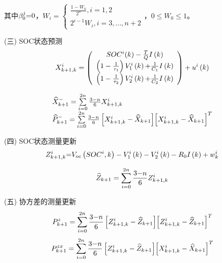 其中$\beta _0^j{\rm{ = }}0$，${W_i} = \left\{ \begin{array}{l}
\frac{{1 - {W_0}}}{{{2^n}}},i = 1,2\\
{2^{i - 1}}{W_i},i = 3,...,n + 2
\end{array} \right.$，$0 \le {W_0} \le 1$。

(三)	SOC状态预测
\begin{equation}
X_{k + 1,k}^i = \left( {\begin{array}{*{20}{c}}
{SO{C^i}(k) - \frac{T}{Q}I\left( k \right)}\\
{\left( {1 - \frac{1}{{{\tau _1}}}} \right)V_1^i\left( k \right){\rm{ + }}\frac{1}{{{C_1}}}I\left( k \right)}\\
{\left( {1 - \frac{1}{{{\tau _2}}}} \right)V_2^i\left( k \right){\rm{ + }}\frac{1}{{{C_2}}}I\left( k \right)}
\end{array}} \right) + {u^i}\left( k \right)
\end{equation}

\begin{equation}
\begin{array}{l}
\widehat X_{k + 1}^ -  = \sum\limits_{i = 0}^{2n} {\frac{{3{\rm{ - }}n}}{6}X_{k + 1,k}^i} \\
\widehat P_{k + 1}^ -  = \sum\limits_{i = 0}^{2n} {\frac{{3{\rm{ - }}n}}{6}\left[ {X_{k + 1,k}^i - {{\widehat X}_{k + 1}}} \right]} {\left[ {X_{k + 1,k}^i - {{\widehat X}_{k + 1}}} \right]^T}
\end{array}
\end{equation}

(四)	SOC状态测量更新
\begin{equation}
Z_{k + 1,k}^i{\rm{ = }}{V_{oc}}\left( {SO{C^i},k} \right) - V_1^i\left( k \right) - V_2^i\left( k \right) - {R_0}I\left( k \right) + w_k^i
\end{equation}

\begin{equation}
{\widehat Z_{k + 1}} = \sum\limits_{i = 0}^{2n} {\frac{{3{\rm{ - }}n}}{6}Z_{k + 1,k}^i} 
\end{equation}

(五)	协方差的测量更新
\begin{equation}
P_{k + 1}^z = \sum\limits_{i = 0}^{2n} {\frac{{3{\rm{ - }}n}}{6}\left[ {Z_{k + 1,k}^i - {{\widehat Z}_{k + 1}}} \right]} {\left[ {Z_{k + 1,k}^i - {{\widehat Z}_{k + 1}}} \right]^T}
\end{equation}
\begin{equation}
P_{k + 1}^{zx} = \sum\limits_{i = 0}^{2n} {\frac{{3{\rm{ - }}n}}{6}\left[ {Z_{k + 1,k}^i - {{\widehat Z}_{k + 1}}} \right]} {\left[ {X_{k + 1,k}^i - {{\widehat X}_{k + 1}}} \right]^T}
\end{equation}

